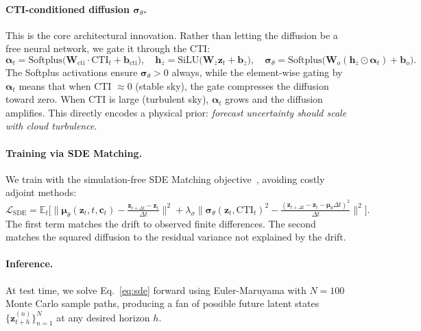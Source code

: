 \documentclass{article}
\begin{document}
\paragraph{CTI-conditioned diffusion $\boldsymbol{\sigma}_\theta$.}
This is the core architectural innovation. Rather than letting the diffusion be a free neural network, we gate it through the CTI:
\begin{equation}
    \boldsymbol{\alpha}_t = \text{Softplus}\big(\mathbf{W}_{\text{cti}} \cdot \text{CTI}_t + \mathbf{b}_{\text{cti}}\big), \quad
    \mathbf{h}_z = \text{SiLU}\big(\mathbf{W}_z \mathbf{z}_t + \mathbf{b}_z\big), \quad
    \boldsymbol{\sigma}_\theta = \text{Softplus}\big(\mathbf{W}_o (\mathbf{h}_z \odot \boldsymbol{\alpha}_t) + \mathbf{b}_o\big).
\end{equation}
The Softplus activations ensure $\boldsymbol{\sigma}_\theta > 0$ always, while the element-wise gating by $\boldsymbol{\alpha}_t$ means that when CTI $\approx 0$ (stable sky), the gate compresses the diffusion toward zero. When CTI is large (turbulent sky), $\boldsymbol{\alpha}_t$ grows and the diffusion amplifies. This directly encodes a physical prior: \emph{forecast uncertainty should scale with cloud turbulence}.

\paragraph{Training via SDE Matching.}
We train with the simulation-free SDE Matching objective~\citep{bartosh2025sde}, avoiding costly adjoint methods:
\begin{equation}
    \mathcal{L}_{\text{SDE}} = \mathbb{E}_t \bigg[\big\|\boldsymbol{\mu}_\theta(\mathbf{z}_t, t, \mathbf{c}_t) - \tfrac{\mathbf{z}_{t+\Delta t} - \mathbf{z}_t}{\Delta t}\big\|^2 + \lambda_\sigma \big\|\boldsymbol{\sigma}_\theta(\mathbf{z}_t, \text{CTI}_t)^2 - \tfrac{(\mathbf{z}_{t+\Delta t} - \mathbf{z}_t - \boldsymbol{\mu}_\theta \Delta t)^2}{\Delta t}\big\|^2\bigg].
\end{equation}
The first term matches the drift to observed finite differences. The second matches the squared diffusion to the residual variance not explained by the drift.

\paragraph{Inference.}
At test time, we solve Eq.~\ref{eq:sde} forward using Euler-Maruyama with $N = 100$ Monte Carlo sample paths, producing a fan of possible future latent states $\{\mathbf{z}_{t+h}^{(n)}\}_{n=1}^N$ at any desired horizon $h$.
\end{document}
